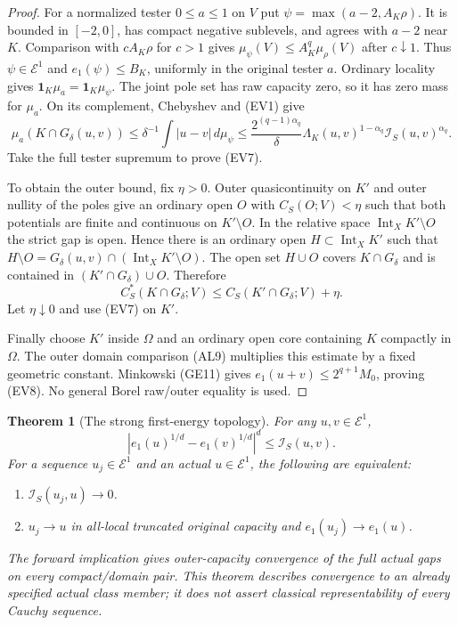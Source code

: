\documentclass[11pt,a4paper]{article}
\numberwithin{equation}{section}
\newtheorem{theorem}{Theorem}[section]
\theoremstyle{definition}
\theoremstyle{remark}
\begin{document}
\begin{proof}
For a normalized tester $0\leq a\leq1$ on $V$ put
$\psi=\max(a-2,A_K\rho)$.
It is bounded in $[-2,0]$, has compact negative sublevels,
and agrees with $a-2$ near $K$.
Comparison with $cA_K\rho$ for $c>1$ gives
$\mu_\psi(V)\leq A_K^q\mu_\rho(V)$ after $c\downarrow1$.
Thus $\psi\in\mathcal E^1$ and $e_1(\psi)\leq B_K$,
uniformly in the original tester $a$. Ordinary locality
gives $\mathbf1_K\mu_a=\mathbf1_K\mu_\psi$.
The joint pole set has raw capacity zero, so it has zero
mass for $\mu_a$. On its complement, Chebyshev and (EV1)
give
\[
 \mu_a(K\cap G_\delta(u,v))
       \leq\delta^{-1}\int|u-v|\,d\mu_\psi
       \leq\frac{2^{(q-1)\alpha_q}}\delta
             \Lambda_K(u,v)^{1-\alpha_q}
                          \mathscr I_S(u,v)^{\alpha_q}.
\]
Take the full tester supremum to prove (EV7).

To obtain the outer bound, fix $\eta>0$. Outer
quasicontinuity on $K'$ and outer nullity of the poles
give an ordinary open $O$ with $C_S(O;V)<\eta$ such
that both potentials are finite and continuous on
$K'\setminus O$. In the relative space
$\operatorname{Int}_X K'\setminus O$ the strict gap is
open. Hence there is an ordinary open $H\subset
\operatorname{Int}_X K'$ such that
$H\setminus O=G_\delta(u,v)\cap
(\operatorname{Int}_X K'\setminus O)$.
The open set $H\cup O$ covers $K\cap G_\delta$ and is
contained in $(K'\cap G_\delta)\cup O$. Therefore
\[
 C_S^*(K\cap G_\delta;V)
              \leq C_S(K'\cap G_\delta;V)+\eta.
\]
Let $\eta\downarrow0$ and use (EV7) on $K'$.

Finally choose $K'$ inside $\Omega$ and an ordinary open
core containing $K$ compactly in $\Omega$. The outer
domain comparison (AL9) multiplies this estimate by a fixed
geometric constant. Minkowski (GE11) gives
$e_1(u+v)\leq2^{q+1}M_0$, proving (EV8).
No general Borel raw/outer equality is used.
\end{proof}

\begin{theorem}[The strong first-energy topology]
\label{thm:r11-strong-first-energy-topology}
For any $u,v\in\mathcal E^1$,
\[
 \left|e_1(u)^{1/d}-e_1(v)^{1/d}\right|^d
                                      \leq\mathscr I_S(u,v).
 \tag{EV9}
\]
For a sequence $u_j\in\mathcal E^1$ and an actual
$u\in\mathcal E^1$, the following are equivalent:
\begin{enumerate}
\item $\mathscr I_S(u_j,u)\to0$.
\item $u_j\to u$ in all-local truncated original capacity
and $e_1(u_j)\to e_1(u)$.
\end{enumerate}
The forward implication gives outer-capacity convergence
of the full actual gaps on every compact/domain pair.
This theorem describes convergence to an already specified
actual class member; it does not assert classical
representability of every Cauchy sequence.
\end{theorem}
\end{document}
